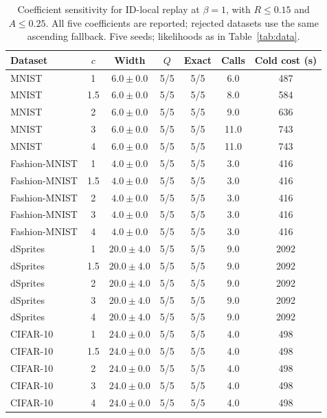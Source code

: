\begin{table}[H]
\caption{Coefficient sensitivity for ID-local replay at $\beta=1$, with $R\le0.15$ and $A\le0.25$. All five coefficients are reported; rejected datasets use the same ascending fallback. Five seeds; likelihoods as in Table~\ref{tab:data}.}\label{tab:coefficient}
\small
\setlength{\tabcolsep}{3pt}
\begin{tabular*}{\textwidth}{@{\extracolsep{\fill}}lcccccc@{}}
\toprule
Dataset & $c$ & Width & $Q$ & Exact & Calls & Cold cost (s) \\
\midrule
MNIST & 1 & $6.0 \pm 0.0$ & 5/5 & 5/5 & 6.0 & 487 \\
MNIST & 1.5 & $6.0 \pm 0.0$ & 5/5 & 5/5 & 8.0 & 584 \\
MNIST & 2 & $6.0 \pm 0.0$ & 5/5 & 5/5 & 9.0 & 636 \\
MNIST & 3 & $6.0 \pm 0.0$ & 5/5 & 5/5 & 11.0 & 743 \\
MNIST & 4 & $6.0 \pm 0.0$ & 5/5 & 5/5 & 11.0 & 743 \\
Fashion-MNIST & 1 & $4.0 \pm 0.0$ & 5/5 & 5/5 & 3.0 & 416 \\
Fashion-MNIST & 1.5 & $4.0 \pm 0.0$ & 5/5 & 5/5 & 3.0 & 416 \\
Fashion-MNIST & 2 & $4.0 \pm 0.0$ & 5/5 & 5/5 & 3.0 & 416 \\
Fashion-MNIST & 3 & $4.0 \pm 0.0$ & 5/5 & 5/5 & 3.0 & 416 \\
Fashion-MNIST & 4 & $4.0 \pm 0.0$ & 5/5 & 5/5 & 3.0 & 416 \\
dSprites & 1 & $20.0 \pm 4.0$ & 5/5 & 5/5 & 9.0 & 2092 \\
dSprites & 1.5 & $20.0 \pm 4.0$ & 5/5 & 5/5 & 9.0 & 2092 \\
dSprites & 2 & $20.0 \pm 4.0$ & 5/5 & 5/5 & 9.0 & 2092 \\
dSprites & 3 & $20.0 \pm 4.0$ & 5/5 & 5/5 & 9.0 & 2092 \\
dSprites & 4 & $20.0 \pm 4.0$ & 5/5 & 5/5 & 9.0 & 2092 \\
CIFAR-10 & 1 & $24.0 \pm 0.0$ & 5/5 & 5/5 & 4.0 & 498 \\
CIFAR-10 & 1.5 & $24.0 \pm 0.0$ & 5/5 & 5/5 & 4.0 & 498 \\
CIFAR-10 & 2 & $24.0 \pm 0.0$ & 5/5 & 5/5 & 4.0 & 498 \\
CIFAR-10 & 3 & $24.0 \pm 0.0$ & 5/5 & 5/5 & 4.0 & 498 \\
CIFAR-10 & 4 & $24.0 \pm 0.0$ & 5/5 & 5/5 & 4.0 & 498 \\
\bottomrule\end{tabular*}
\end{table}
